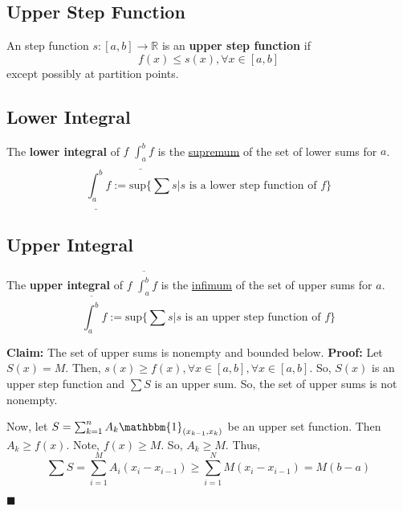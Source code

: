 \documentclass[11pt]{book}
\newcommand{\R}{\mathbb{R}}
\newcommand{\QED}{\begin{flushright}$\blacksquare$\end{flushright}}
\begin{document}
	\subsection{Upper Step Function}
	\label{subsec:upperstepfunction}
		\begin{defin}
			An step function $s:[a,b] \to \R$ is an \textbf{upper step function} if 
			$$f(x) \leq s(x), \forall x \in [a,b]$$
			except possibly at partition points.
		\end{defin}
	
	\subsection{Lower Integral}
	\label{subsec:lowerintegral}
		\begin{defin}
			The \textbf{lower integral} of $f$ $\underline{\int_a^b }f$ is the \hyperref[subsec:supremum]{supremum}  of the set of lower sums for $a$.
			$$\underline{\int_a^b}f := \text{sup}\{\sum s | s \text{ is a lower step function of } f \}$$
		\end{defin}

	\subsection{Upper Integral}
	\label{subsec:upperintegral}
		\begin{defin}
			The \textbf{upper integral} of $f$ $\overline{\int_a^b }f$ is the \hyperref[subsec:infimum]{infimum}  of the set of upper sums for $a$.
			$$\overline{\int_a^b}f := \text{sup}\{\sum s | s \text{ is an upper step function of } f \}$$
		\end{defin}

		\begin{examp}
			\textbf{Claim:} The set of upper sums is nonempty and bounded below. 
			\textbf{Proof:} Let $S(x) = M$. Then, $s(x) \geq f(x), \forall x \in [a,b], \forall x \in [a,b]$. So, $S(x)$ is an upper step function and $\sum S$ is an upper sum. So, 
			the set of upper sums is not nonempty.

			Now, let $S = \sum_{k=1}^n{A_k \mathbbm{1}_{(x_{k-1}, x_k)}}$ be an upper set function. Then $A_k \geq f(x)$. Note, $f(x) \geq M$. So, $A_k \geq M$. Thus, 
			$$\sum S = \sum_{i = 1}^M{A_i(x_i - x_{i-1})} \geq \sum_{i = 1}^N{M(x_i - x_{i-1})} = M(b-a)$$
			\QED
		\end{examp}
\end{document}
